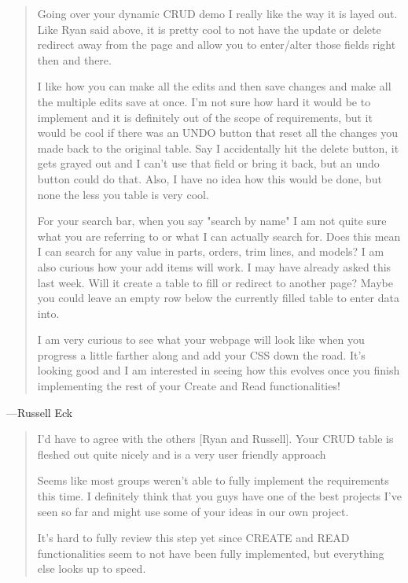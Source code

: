 \documentclass[11pt,letterpaper,oneside]{amsart}
\begin{document}
\begin{quotation}

Going over your dynamic CRUD demo I really like the way it is layed out. Like Ryan said above, it is pretty cool to not have the update or delete redirect away from the page and allow you to enter/alter those fields right then and there.

I like how you can make all the edits and then save changes and make all the multiple edits save at once. I'm not sure how hard it would be to implement and it is definitely out of the scope of requirements, but it would be cool if there was an UNDO button that reset all the changes you made back to the original table. Say I accidentally hit the delete button, it gets grayed out and I can't use that field or bring it back, but an undo button could do that. Also, I have no idea how this would be done, but none the less you table is very cool.

For your search bar, when you say "search by name" I am not quite sure what you are referring to or what I can actually search for. Does this mean I can search for any value in parts, orders, trim lines, and models? I am also curious how your add items will work. I may have already asked this last week. Will it create a table to fill or redirect to another page? Maybe you could leave an empty row below the currently filled table to enter data into.

I am very curious to see what your webpage will look like when you progress a little farther along and add your CSS down the road. It's looking good and I am interested in seeing how this evolves once you finish implementing the rest of your Create and Read functionalities!

\end{quotation}
    
---Russell Eck

\begin{quotation}
I'd have to agree with the others [Ryan and Russell]. Your CRUD table is fleshed out quite nicely and is a very user friendly approach

Seems like most groups weren't able to fully implement the requirements this time. I definitely think that you guys have one of the best projects I've seen so far and might use some of your ideas in our own project.

It's hard to fully review this step yet since CREATE and READ functionalities seem to not have been fully implemented, but everything else looks up to speed.

\end{quotation}
    
\end{document}
